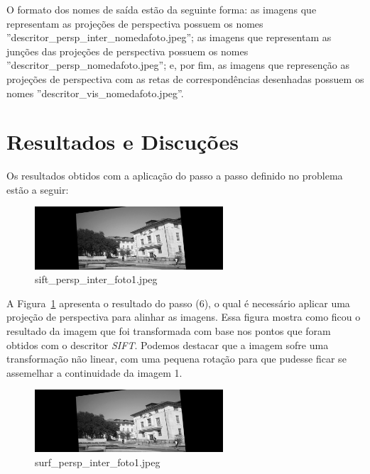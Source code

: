 \documentclass[twoside,twocolumn]{article}
\begin{document}
O formato dos nomes de saída estão da seguinte forma: as imagens que representam as projeções de perspectiva possuem os nomes ''descritor\_persp\_inter\_nomedafoto.jpeg''; as imagens que representam as junções das projeções de perspectiva possuem os nomes ''descritor\_persp\_nomedafoto.jpeg''; e, por fim, as imagens que represenção as projeções de perspectiva com as retas de correspondências desenhadas possuem os nomes ''descritor\_vis\_nomedafoto.jpeg''.


\section{Resultados e Discuções}

Os resultados obtidos com a aplicação do passo a passo definido no problema estão a seguir:

\begin{figure}[H]
\begin{center}
	\includegraphics[width=7cm]{figures/sift_persp_inter_foto1.jpeg}
\caption{sift\_persp\_inter\_foto1.jpeg} \label{sift_persp_inter_foto1}
\end{center}
\end{figure}

A Figura~\ref{sift_persp_inter_foto1} apresenta o resultado do passo (6), o qual é necessário aplicar uma projeção de perspectiva para alinhar as imagens. Essa figura mostra como ficou o resultado da imagem que foi transformada com base nos pontos que foram obtidos com o descritor \textit{SIFT}. Podemos destacar que a imagem sofre uma transformação não linear, com uma pequena rotação para que pudesse ficar se assemelhar a continuidade da imagem 1.

\begin{figure}[H]
\begin{center}
	\includegraphics[width=7cm]{figures/surf_persp_inter_foto1.jpeg}
\caption{surf\_persp\_inter\_foto1.jpeg} \label{surf_persp_inter_foto1}
\end{center}
\end{figure}
\end{document}
